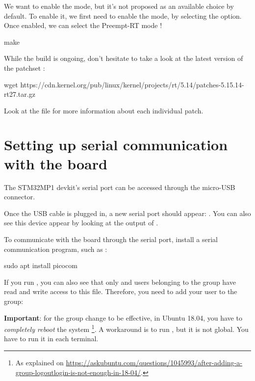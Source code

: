 We want to enable the  mode, but it's not proposed as an available choice by default. To enable it, we first need to enable the  mode, by selecting the  option. Once enabled, we can select the Preempt-RT mode !

\begin{bashinput}
make
\end{bashinput}

While the build is ongoing, don't hesitate to take a look at the latest
version of the patchset :

\begin{bashinput}
wget https://cdn.kernel.org/pub/linux/kernel/projects/rt/5.14/patches-5.15.14-rt27.tar.gz
\end{bashinput}

Look at the  file for more information about each individual patch.

\section{Setting up serial communication with the board}

The STM32MP1 devkit's serial port can be accessed through the micro-USB connector.

Once the USB cable is plugged in, a new serial port
should appear: .  You can also see this device
appear by looking at the output of .

To communicate with the board through the serial port, install a
serial communication program, such as :

\begin{bashinput}
sudo apt install picocom
\end{bashinput}

If you run , you can also see that only
 and users belonging to the  group have
read and write access to this file. Therefore, you need to add your user
to the  group:


{\bf Important}: for the group change to be effective, in Ubuntu 18.04, you have to
{\em completely reboot} the system \footnote{As explained on
\url{https://askubuntu.com/questions/1045993/after-adding-a-group-logoutlogin-is-not-enough-in-18-04/}.}.
A workaround is to run , but it is not global.
You have to run it in each terminal.

